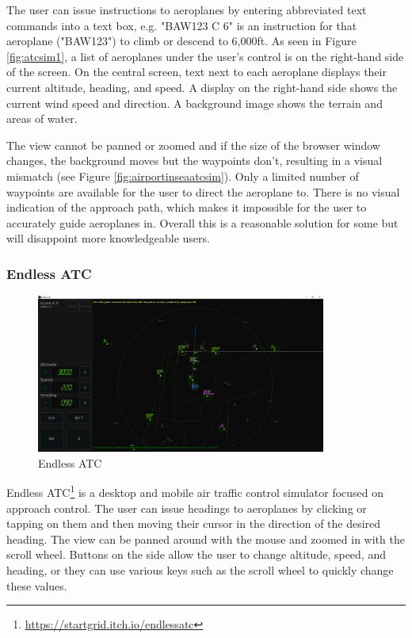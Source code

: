 \documentclass{article}
\begin{document}
The user can issue instructions to aeroplanes by entering abbreviated text commands into a text box, e.g. "BAW123 C 6" is an instruction for that aeroplane ("BAW123") to climb or descend to 6,000ft.
As seen in Figure \ref{fig:atcsim1}, a list of aeroplanes under the user's control is on the right-hand side of the screen.
On the central screen, text next to each aeroplane displays their current altitude, heading, and speed.
A display on the right-hand side shows the current wind speed and direction.
A background image shows the terrain and areas of water.

The view cannot be panned or zoomed and if the size of the browser window changes, the background moves but the waypoints don't, resulting in a visual mismatch (see Figure \ref{fig:airportinseaatcsim}).
Only a limited number of waypoints are available for the user to direct the aeroplane to.
There is no visual indication of the approach path, which makes it impossible for the user to accurately guide aeroplanes in.
Overall this is a reasonable solution for some but will disappoint more knowledgeable users.

\subsubsection{Endless ATC} \label{endlessatc}
\begin{figure}[H]
\centering
\includegraphics[width=0.85\textwidth]{existing_solutions/endlessatc.png}
\caption{\label{fig:endlessatc1}Endless ATC}
\end{figure}
Endless ATC\footnote{\url{https://startgrid.itch.io/endlessatc}} is a desktop and mobile air traffic control simulator focused on approach control.
The user can issue headings to aeroplanes by clicking or tapping on them and then moving their cursor in the direction of the desired heading.
The view can be panned around with the mouse and zoomed in with the scroll wheel.
Buttons on the side allow the user to change altitude, speed, and heading, or they can use various keys such as the scroll wheel to quickly change these values.
\end{document}
